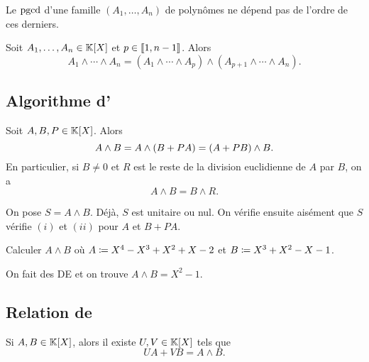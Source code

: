 \documentclass{magnolia}
\begin{document}
\begin{remarqueUnique}
\remarque Le $\operatorname{pgcd}$ d'une famille $(A_1,\ldots,A_n)$ de polynômes ne dépend pas de l'ordre de
  ces derniers.
\end{remarqueUnique}

\begin{proposition}
Soit $A_1,\ldots,A_n\in\polyK$ et $p\in\left\llbracket 1,n-1\right\rrbracket$. Alors
\[A_1\wedge\cdots\wedge A_n=(A_1\wedge\cdots\wedge A_p)\wedge(A_{p+1}\wedge\cdots\wedge A_n).\]
\end{proposition}


\subsection{Algorithme d'}

\begin{proposition}
Soit $A,B,P\in\polyK$. Alors
\[A\wedge B=A\wedge\left(B+PA\right)=\left(A+PB\right)\wedge B.\]
En particulier, si $B\neq 0$ et $R$ est le reste de la division euclidienne de
$A$ par $B$, on a
\[A\wedge B=B\wedge R.\]
\end{proposition}

\begin{preuve}
On pose $S=A\wedge B$. Déjà, $S$ est unitaire ou nul. On vérifie ensuite aisément que $S$ vérifie $(i)$ et $(ii)$ pour $A$ et $B+PA$.
\end{preuve}

\begin{exoUnique}
\exo Calculer $A\wedge B$ où $A\coloneqq X^4-X^3+X^2+X-2$ et $B\coloneqq X^3+X^2-X-1$.
  \begin{sol}
  On fait des DE et on trouve $A\wedge B=X^2-1$.
  \end{sol}
\end{exoUnique}


\subsection{Relation de }

\begin{proposition}
Si $A,B\in\polyK$, alors il existe $U,V\in\polyK$ tels que
\[UA+VB=A\wedge B.\]
\end{proposition}
\end{document}
